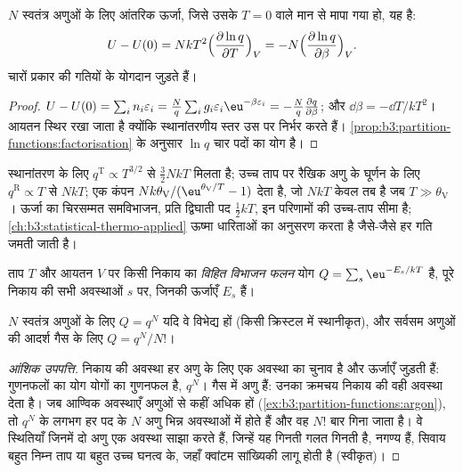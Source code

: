 \begin{theorem}[आंतरिक ऊर्जा]\label{thm:b3:partition-functions:internal-energy}
$N$ स्वतंत्र अणुओं के लिए आंतरिक ऊर्जा, जिसे उसके
$T = 0$ वाले मान से मापा गया हो, यह है:
\[
  U - U(0) = NkT^2\Bigl(\frac{\partial\ln q}{\partial T}\Bigr)_V
          = -N\Bigl(\frac{\partial\ln q}{\partial\beta}\Bigr)_V .
\]
चारों प्रकार की गतियों के योगदान जुड़ते हैं।
\end{theorem}

\begin{proof}
$U - U(0) = \sum_in_i\varepsilon_i = \frac Nq\sum_ig_i\varepsilon_i\eu^{-\beta\varepsilon_i} = -\frac Nq\frac{\partial q}{\partial\beta}$;
और $\dd\beta = -\dd T/kT^2$। आयतन स्थिर रखा जाता है क्योंकि स्थानांतरणीय
स्तर उस पर निर्भर करते हैं। \cref{prop:b3:partition-functions:factorisation} के अनुसार $\ln q$
चार पदों का योग है।
\end{proof}

स्थानांतरण के लिए $q^{\mathrm T} \propto T^{3/2}$ से $\frac32NkT$ मिलता है; उच्च ताप पर रैखिक
अणु के घूर्णन के लिए $q^{\mathrm R} \propto T$ से $NkT$; एक कंपन
$Nk\theta_{\mathrm V}/(\eu^{\theta_{\mathrm V}/T} - 1)$ देता है, जो $NkT$ केवल तब है जब $T \gg \theta_{\mathrm V}$।
ऊर्जा का चिरसम्मत समविभाजन, प्रति द्विघाती पद $\frac12kT$, इन परिणामों की
उच्च-ताप सीमा है; \cref{ch:b3:statistical-thermo-applied}
ऊष्मा धारिताओं का अनुसरण करता है जैसे-जैसे हर गति जमती जाती है।

\begin{definition}[विहित विभाजन फलन]\label{def:b3:partition-functions:canonical}
ताप $T$ और आयतन $V$ पर किसी निकाय का \emph{विहित विभाजन फलन}
योग $Q = \sum_s\eu^{-E_s/kT}$ है, पूरे निकाय की सभी अवस्थाओं $s$ पर, जिनकी ऊर्जाएँ $E_s$ हैं।
\end{definition}

\begin{proposition}\label{prop:b3:partition-functions:canonical}
$N$ स्वतंत्र अणुओं के लिए $Q = q^N$ यदि वे विभेद्य हों (किसी
क्रिस्टल में स्थानीकृत), और सर्वसम अणुओं की आदर्श गैस के लिए $Q = q^N/N!$।
\end{proposition}

\begin{proof}[आंशिक उपपत्ति]
निकाय की अवस्था हर अणु के लिए एक अवस्था का चुनाव है और ऊर्जाएँ
जुड़ती हैं: गुणनफलों का योग योगों का गुणनफल है, $q^N$। गैस में
अणु  हैं: उनका क्रमचय निकाय की वही अवस्था देता है।
जब आण्विक अवस्थाएँ अणुओं से कहीं अधिक हों
(\cref{ex:b3:partition-functions:argon}), तो $q^N$ के लगभग हर पद के $N$
अणु भिन्न अवस्थाओं में होते हैं और वह $N!$ बार गिना जाता है। वे स्थितियाँ जिनमें दो
अणु एक अवस्था साझा करते हैं, जिन्हें यह गिनती गलत गिनती है, नगण्य हैं, सिवाय
बहुत निम्न ताप या बहुत उच्च घनत्व के, जहाँ क्वांटम सांख्यिकी
लागू होती है (स्वीकृत)।
\end{proof}


